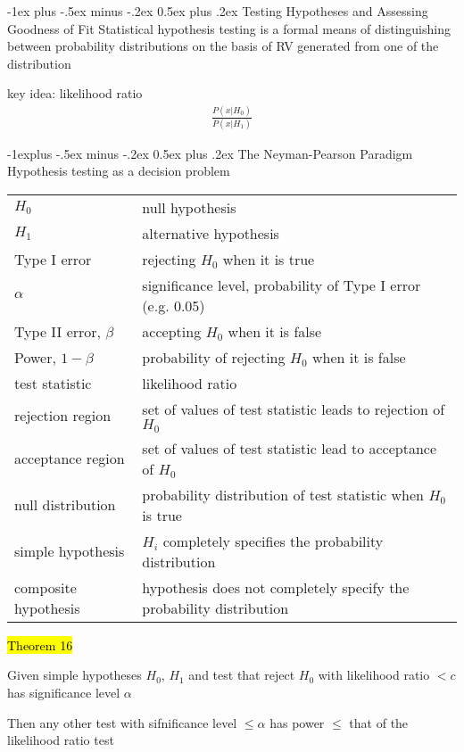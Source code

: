 \documentclass[a4paper,12pt,landscape]{article}
\makeatletter
\renewcommand{\section}{\@startsection{section}{1}{0mm}%
                                {-1ex plus -.5ex minus -.2ex}%
                                {0.5ex plus .2ex}%
                                {\normalfont\large\bfseries\color{red}}}
\renewcommand{\subsection}{\@startsection{subsection}{2}{0mm}%
                                {-1explus -.5ex minus -.2ex}%
                                {0.5ex plus .2ex}%
                                {\normalfont\normalsize\bfseries\color{blue}}}
\makeatother
\begin{document}
\begin{multicols}{3}
\section{Testing Hypotheses and Assessing Goodness of Fit}
Statistical hypothesis testing is a formal means 
of distinguishing between probability distributions on the basis of RV generated from one of the distribution

key idea: likelihood ratio
\begin{align*}
    \frac{P(x|H_0)}{P(x|H_1)}
\end{align*}

\subsection{The Neyman-Pearson Paradigm}
Hypothesis testing as a decision problem
\begin{tabulary}{\linewidth}{l@{ : }L}
        $H_0$ & null hypothesis\\
        $H_1$ & alternative hypothesis\\
        Type I error & rejecting $H_0$ when it is true\\
        $\alpha$ & significance level, probability of Type I error (e.g. 0.05)\\
        Type II error, $\beta$ & accepting $H_0$ when it is false\\
        Power, $1-\beta$& probability of rejecting $H_0$ when it is false\\
        test statistic & likelihood ratio\\
        rejection region & set of values of test statistic leads to rejection of $H_0$\\
        acceptance region & set of values of test statistic lead to acceptance of $H_0$\\
        null distribution & probability distribution of test statistic when $H_0$ is true\\
        simple hypothesis & $H_i$ completely specifies the probability distribution\\
        composite hypothesis & hypothesis does not completely specify the probability distribution
    \end{tabulary}
    \hl{Theorem 16} 

    Given simple hypotheses $H_0$, $H_1$ and test that reject $H_0$ with likelihood ratio $<c$ has significance level $\alpha$

    Then any other test with sifnificance level $\leq\alpha$ has power $\leq$ that of the likelihood ratio test


\end{multicols}
\end{document}
